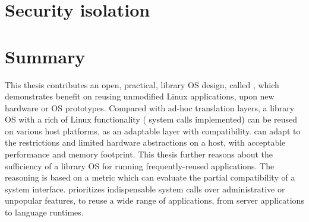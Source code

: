 \section{Security isolation}
\label{sec:intro:security}

\placeholder{}




\section{Summary}

This thesis contributes an open, practical, library OS design, called \graphene{},
which demonstrates benefit on reusing unmodified Linux applications, upon new hardware or OS prototypes.
Compared with ad-hoc translation layers,
a library OS with a rich of Linux functionality (\graphenesyscallnum{} system calls implemented) can be reused on various host platforms, as an adaptable layer with compatibility.
\graphene{} can adapt to the restrictions and
limited hardware abstractions on a host, with acceptable performance and memory footprint.
This thesis further reasons about the sufficiency of a library OS
for running frequently-reused applications. The reasoning is based on a metric which can evaluate the partial compatibility of a system interface.
\graphene{} prioritizes indispensable system calls over administrative or unpopular features,
to reuse a wide range of applications, from server applications to language runtimes.


